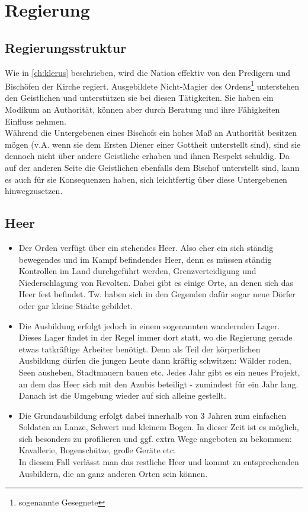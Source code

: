 \chapter{Regierung} \label{ch:regierung}

\section{Regierungsstruktur}
Wie in \ref{ch:klerus} beschrieben, wird die Nation effektiv von den Predigern und Bischöfen der Kirche regiert. 
Ausgebildete Nicht-Magier des Ordens\footnote{sogenannte Gesegnete} unterstehen den Geistlichen und unterstützen sie bei diesen Tätigkeiten. 
Sie haben ein Modikum an Authorität, können aber durch Beratung und ihre Fähigkeiten Einfluss nehmen.\\
Während die Untergebenen eines Bischofs ein hohes Maß an Authorität besitzen mögen (v.A. wenn sie dem Ersten Diener einer Gottheit unterstellt sind), sind sie dennoch nicht über andere Geistliche erhaben und ihnen Respekt schuldig.
Da auf der anderen Seite die Geistlichen ebenfalls dem Bischof unterstellt sind, kann es auch für sie Konsequenzen haben, sich leichtfertig über diese Untergebenen hinwegzusetzen.

\section{Heer}
\begin{itemize}
	\item Der Orden verfügt über ein stehendes Heer. 
		Also eher ein sich ständig bewegendes und im Kampf befindendes Heer, denn es müssen ständig Kontrollen im Land durchgeführt werden, Grenzverteidigung und Niederschlagung von Revolten. 
		Dabei gibt es einige Orte, an denen sich das Heer fest befindet. 
		Tw. haben sich in den Gegenden dafür sogar neue Dörfer oder gar kleine Städte gebildet.
	\item Die Ausbildung erfolgt jedoch in einem sogenannten wandernden Lager. 
		Dieses Lager findet in der Regel immer dort statt, wo die Regierung gerade etwas tatkräftige Arbeiter benötigt. 
		Denn als Teil der körperlichen Ausbildung dürfen die jungen Leute dann kräftig schwitzen: Wälder roden, Seen ausheben, Stadtmauern bauen etc. 
		Jedes Jahr gibt es ein neues Projekt, an dem das Heer sich mit den Azubis beteiligt - zumindest für ein Jahr lang. 
		Danach ist die Umgebung wieder auf sich alleine gestellt.
	\item Die Grundausbildung erfolgt dabei innerhalb von 3 Jahren zum einfachen Soldaten an Lanze, Schwert und kleinem Bogen. 
		In dieser Zeit ist es möglich, sich besonders zu profilieren und ggf. extra Wege angeboten zu bekommen: Kavallerie, Bogenschütze, große Geräte etc. \\ 
		In diesem Fall verlässt man das restliche Heer und kommt zu entsprechenden Ausbildern, die an ganz anderen Orten sein können.
\end{itemize}